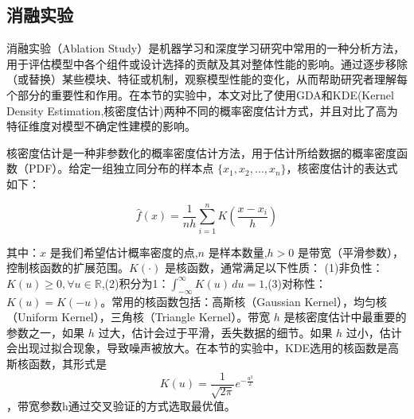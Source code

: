 \subsection{消融实验}
消融实验（Ablation Study）是机器学习和深度学习研究中常用的一种分析方法，用于评估模型中各个组件或设计选择的贡献及其对整体性能的影响。通过逐步移除（或替换）某些模块、特征或机制，观察模型性能的变化，从而帮助研究者理解每个部分的重要性和作用。在本节的实验中，本文对比了使用GDA和KDE\cite{davis2011remarks}(Kernel Density Estimation,核密度估计)两种不同的概率密度估计方式，并且对比了高为特征维度对模型不确定性建模的影响。

核密度估计是一种非参数化的概率密度估计方法，用于估计所给数据的概率密度函数（PDF）。给定一组独立同分布的样本点 $\{x_1, x_2, \ldots, x_n\}$，核密度估计的表达式如下：

\[
\hat{f}(x) = \frac{1}{n h} \sum_{i=1}^n K\left(\frac{x - x_i}{h}\right)
\]

其中：$x$ 是我们希望估计概率密度的点,$n$ 是样本数量,$h > 0$ 是带宽（平滑参数），控制核函数的扩展范围。$K(\cdot)$ 是核函数，通常满足以下性质： (1)非负性：$K(u) \geq 0, \forall u \in \mathbb{R}$,(2)积分为1：$\int_{-\infty}^\infty K(u) \, du = 1$,(3)对称性：$K(u) = K(-u)$。常用的核函数包括：高斯核（Gaussian Kernel），均匀核（Uniform Kernel），三角核（Triangle Kernel）。带宽 $h$ 是核密度估计中最重要的参数之一，如果 $h$ 过大，估计会过于平滑，丢失数据的细节。如果 $h$ 过小，估计会出现过拟合现象，导致噪声被放大。在本节的实验中，KDE选用的核函数是高斯核函数，其形式是\[K(u) = \frac{1}{\sqrt{2\pi}} e^{-\frac{u^2}{2}}\]，带宽参数h通过交叉验证的方式选取最优值。

